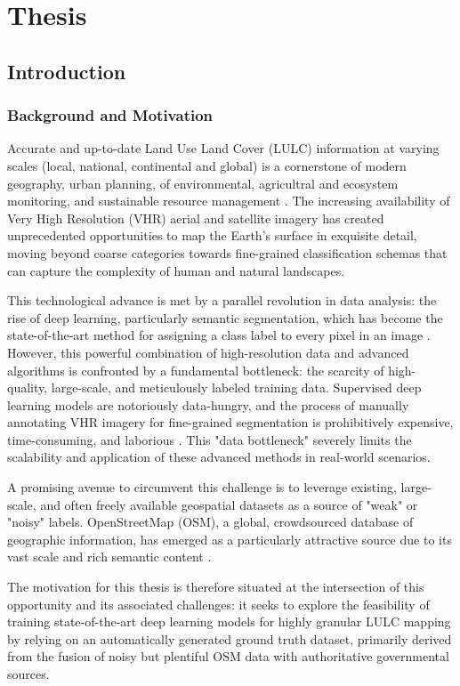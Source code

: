 \documentclass{report}
\newcommand{\addunnumberedchapter}[2]{%
  \chapter*{#1}%
  \addcontentsline{toc}{chapter}{#2}%
}
\begin{document}
\addunnumberedchapter{Thesis}{Thesis}
\section{Introduction}
\subsection{Background and Motivation}
Accurate and up-to-date Land Use Land Cover (LULC) information at varying scales (local, national, continental and global) is a cornerstone of modern geography, urban planning, of environmental, agricultral and ecosystem monitoring, and sustainable resource management \parencites[p.~2;]{TalukdarEtAlLandUseLandCoverClassificationMachineLearningClassifiersSatelliteObservationsReview2020}[p.~47]{KandzioraEtAlMappingprovisioningecosystemserviceslocalscaleusingdatavaryingspatialtemporalresolution2013}. The increasing availability of Very High Resolution (VHR) aerial and satellite imagery has created unprecedented opportunities to map the Earth's surface in exquisite detail, moving beyond coarse categories towards fine-grained classification schemas that can capture the complexity of human and natural landscapes.\par
This technological advance is met by a parallel revolution in data analysis: the rise of deep learning, particularly semantic segmentation, which has become the state-of-the-art method for assigning a class label to every pixel in an image \parencite[p.~311f.]{KotaridisLazaridouRemotesensingimagesegmentationadvancesmetaanalysis2021a}.
However, this powerful combination of high-resolution data and advanced algorithms is confronted by a fundamental bottleneck: the scarcity of high-quality, large-scale, and meticulously labeled training data. Supervised deep learning models are notoriously data-hungry, and the process of manually annotating VHR imagery for fine-grained segmentation is prohibitively expensive, time-consuming, and laborious \parencite[p.~1]{KaiserEtAlLearningAerialImageSegmentationOnlineMaps2017}. This "data bottleneck" severely limits the scalability and application of these advanced methods in real-world scenarios. \par
A promising avenue to circumvent this challenge is to leverage existing, large-scale, and often freely available geospatial datasets as a source of "weak" or "noisy" labels. OpenStreetMap (OSM), a global, crowdsourced database of geographic information, has emerged as a particularly attractive source due to its vast scale and rich semantic content \parencite[p.~2]{UsmaniEtAlRemoteSensingDeepLearningUnderstandNoisyOpenStreetMap2023}. \par
The motivation for this thesis is therefore situated at the intersection of this opportunity and its associated challenges: it seeks to explore the feasibility of training state-of-the-art deep learning models for highly granular LULC mapping by relying on an automatically generated ground truth dataset, primarily derived from the fusion of noisy but plentiful OSM data with authoritative governmental sources.
\end{document}
